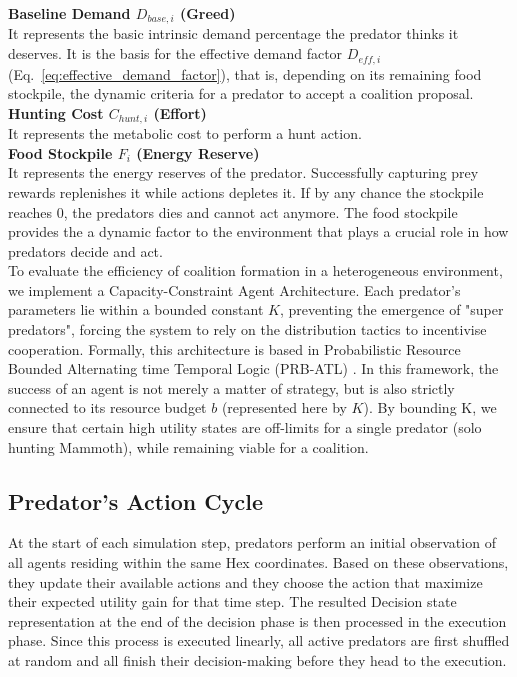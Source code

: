 \documentclass[12pt,a4paper]{report}
\begin{document}
	\textbf{Baseline Demand $D_{base,i}$ (Greed)} \\
	
	It represents the basic intrinsic demand percentage the predator thinks it deserves. It is the basis for the effective demand factor $D_{eff,i}$ (Eq.~\ref{eq:effective_demand_factor}), that is, depending on its remaining food stockpile, the dynamic criteria for a predator to accept a coalition proposal. \\
	
	\textbf{Hunting Cost $C_{hunt,i}$ (Effort)} \\
	
	It represents the metabolic cost to perform a hunt action. \\
	
	\textbf{Food Stockpile $F_{i}$ (Energy Reserve)} \\
	
	It represents the energy reserves of the predator. Successfully capturing prey rewards replenishes it while actions depletes it. If by any chance the stockpile reaches 0, the predators dies and cannot act anymore. The food stockpile provides the a dynamic factor to the environment that plays a crucial role in how predators decide and act. \\
	
	To evaluate the efficiency of coalition formation in a heterogeneous environment, we implement a Capacity-Constraint Agent Architecture. Each predator's parameters lie within a bounded constant $K$, preventing the emergence of "super predators", forcing the system to rely on the distribution tactics to incentivise cooperation. Formally, this architecture is based in Probabilistic Resource Bounded Alternating time Temporal Logic (PRB-ATL) \cite{Nguyen2023}. In this framework, the success of an agent is not merely a matter of strategy, but is also strictly connected to its resource budget $b$ (represented here by $K$). By bounding K, we ensure that certain high utility states are off-limits for a single predator (solo hunting Mammoth), while remaining viable for a coalition. \\
	
	\subsection{Predator's Action Cycle}
	
	At the start of each simulation step, predators perform an initial observation of all agents residing within the same Hex coordinates. Based on these observations, they update their available actions and they choose the action that maximize their expected utility gain for that time step. The resulted Decision state representation at the end of the decision phase is then processed in the execution phase. Since this process is executed linearly, all active predators are first shuffled at random and all finish their decision-making before they head to the execution. \\
	
\end{document}
